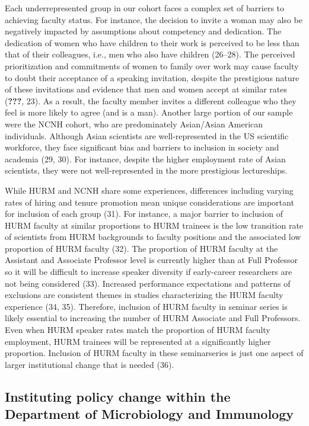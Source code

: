 \documentclass[10pt,]{article}
\begin{document}
Each underrepresented group in our cohort faces a complex set of
barriers to achieving faculty status. For instance, the decision to
invite a woman may also be negatively impacted by assumptions about
competency and dedication. The dedication of women who have children to
their work is perceived to be less than that of their colleagues, i.e.,
men who also have children (26--28). The perceived prioritization and
commitments of women to family over work may cause faculty to doubt
their acceptance of a speaking invitation, despite the prestigious
nature of these invitations and evidence that men and women accept at
similar rates ({\textbf{???}}, 23). As a result, the faculty member
invites a different colleague who they feel is more likely to agree (and
is a man). Another large portion of our sample were the NCNH cohort, who
are predominately Asian/Asian American individuals. Although Asian
scientists are well-represented in the US scientific workforce, they
face significant bias and barriers to inclusion in society and academia
(29, 30). For instance, despite the higher employment rate of Asian
scientists, they were not well-represented in the more prestigious
lectureships.

While HURM and NCNH share some experiences, differences including
varying rates of hiring and tenure promotion mean unique considerations
are important for inclusion of each group (31). For instance, a major
barrier to inclusion of HURM faculty at similar proportions to HURM
trainees is the low transition rate of scientists from HURM backgrounds
to faculty positions and the associated low proportion of HURM faculty
(32). The proportion of HURM faculty at the Assistant and Associate
Professor level is currently higher than at Full Professor so it will be
difficult to increase speaker diversity if early-career researchers are
not being considered (33). Increased performance expectations and
patterns of exclusions are consistent themes in studies characterizing
the HURM faculty experience (34, 35). Therefore, inclusion of HURM
faculty in seminar series is likely essential to increasing the number
of HURM Associate and Full Professors. Even when HURM speaker rates
match the proportion of HURM faculty employment, HURM trainees will be
represented at a significantly higher proportion. Inclusion of HURM
faculty in these seminarseries is just one aspect of larger
institutional change that is needed (36).

\subsection{Instituting policy change within the Department of
Microbiology and
Immunology}\label{instituting-policy-change-within-the-department-of-microbiology-and-immunology}
\end{document}

